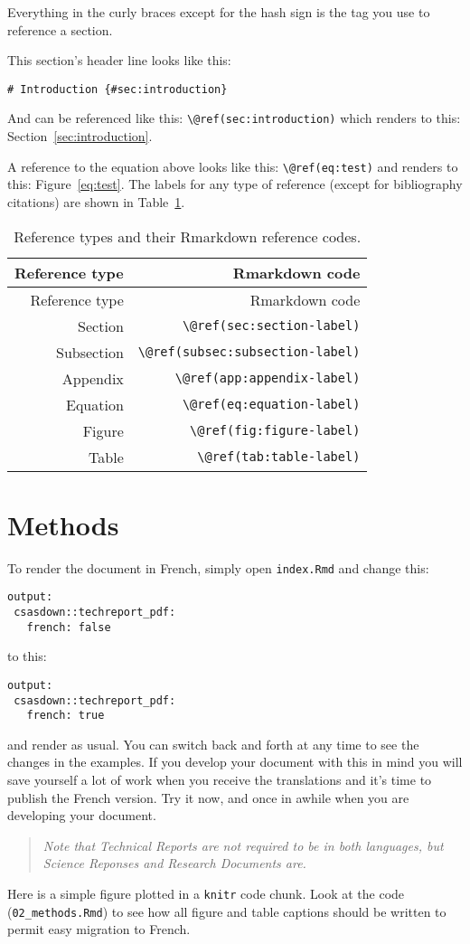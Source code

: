 \documentclass[12pt]{article}\usepackage[]{graphicx}\usepackage[]{color}
\begin{document}
Everything in the curly braces except for the hash sign is the tag you use to reference a section.

This section's header line looks like this:

\texttt{\#\ Introduction\ \{\#sec:introduction\}}

And can be referenced like this: \texttt{\textbackslash{}@ref(sec:introduction)} which renders to this: Section~\ref{sec:introduction}.

A reference to the equation above looks like this: \texttt{\textbackslash{}@ref(eq:test)} and renders to this: Figure~\ref{eq:test}. The labels for any type of reference (except for bibliography citations) are shown in Table~\ref{tab:ref-tab}.
\begin{longtable}[]{@{}rr@{}}
\caption{\label{tab:ref-tab}Reference types and their Rmarkdown reference codes.}\tabularnewline
\toprule()
Reference type & Rmarkdown code \\
\midrule()
\endfirsthead
\toprule()
Reference type & Rmarkdown code \\
\midrule()
\endhead
Section & \texttt{\textbackslash{}@ref(sec:section-label)} \\
Subsection & \texttt{\textbackslash{}@ref(subsec:subsection-label)} \\
Appendix & \texttt{\textbackslash{}@ref(app:appendix-label)} \\
Equation & \texttt{\textbackslash{}@ref(eq:equation-label)} \\
Figure & \texttt{\textbackslash{}@ref(fig:figure-label)} \\
Table & \texttt{\textbackslash{}@ref(tab:table-label)} \\
\bottomrule()
\end{longtable}
\hypertarget{methods}{%
\section{Methods}\label{methods}}

To render the document in French, simply open \texttt{index.Rmd} and change this:
\begin{verbatim}
output:
 csasdown::techreport_pdf:
   french: false
\end{verbatim}
to this:
\begin{verbatim}
output:
 csasdown::techreport_pdf:
   french: true
\end{verbatim}
and render as usual. You can switch back and forth at any time to see the changes in the examples. If you develop your document with this in mind you will save yourself a lot of work when you receive the translations and it's time to publish the French version. Try it now, and once in awhile when you are developing your document.
\begin{quote}
\emph{Note that Technical Reports are not required to be in both languages, but Science Reponses and Research Documents are.}
\end{quote}
Here is a simple figure plotted in a \texttt{knitr} code chunk. Look at the code (\texttt{02\_methods.Rmd}) to see how all figure and table captions should be written to permit easy migration to French.
\end{document}
